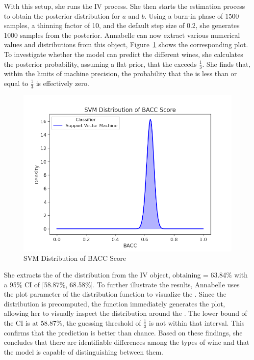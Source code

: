 \documentclass[man]{apa7}
\begin{document}
With this setup, she runs the IV process.
She then starts the estimation process to obtain the posterior distribution for $a$ and $b$.
Using a burn-in phase of 1500 samples, a thinning factor of 10, and the default step size of 0.2, she generates 1000 samples from the posterior.
Annabelle can now extract various numerical values and distributions from this object, Figure~\ref{fig:svmclassifier} shows the corresponding plot.
To investigate whether the model can predict the different wines, she calculates the posterior probability, assuming a flat prior, that the  exceeds $\frac{1}{3}$. She finds that, within the limits of machine precision, the probability that the  is less than or equal to $\frac{1}{3}$ is effectively zero.

\begin{figure}[t!]
\centering
\includegraphics{plots/figure1.png}
\caption{SVM Distribution of BACC Score}\label{fig:svmclassifier}
\end{figure}

She extracts the  of the distribution from the IV object, obtaining  = 63.84\% with a 95\% CI of [58.87\%, 68.58\%].
To further illustrate the results, Annabelle uses the plot parameter of the distribution function to visualize the .
Since the distribution is precomputed, the function immediately generates the plot, allowing her to visually inspect the distribution around the .
The lower bound of the CI is at 58.87\%, the guessing threshold of $\frac{1}{3}$ is not within that interval. This confirms that the prediction is better than chance.
Based on these findings, she concludes that there are identifiable differences among the types of wine and that the model is capable of distinguishing between them.
\end{document}
